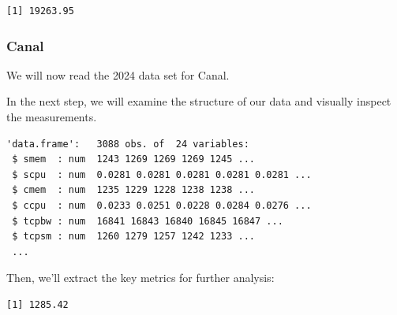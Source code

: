 \begin{verbatim}
[1] 19263.95
\end{verbatim}

\subsubsection{Canal}

We will now read the 2024 data set for Canal.

\begin{Shaded}
\begin{Highlighting}[]
\OtherTok{\textless{}{-}} 
\OtherTok{\textless{}{-}} \NormalTok{(}\NormalTok{,}\NormalTok{))}
\end{Highlighting}
\end{Shaded}

In the next step, we will examine the structure of our data and visually
inspect the measurements.

\begin{Shaded}
\begin{Highlighting}[]
\end{Highlighting}
\end{Shaded}

\begin{verbatim}
'data.frame':   3088 obs. of  24 variables:
 $ smem  : num  1243 1269 1269 1269 1245 ...
 $ scpu  : num  0.0281 0.0281 0.0281 0.0281 0.0281 ...
 $ cmem  : num  1235 1229 1228 1238 1238 ...
 $ ccpu  : num  0.0233 0.0251 0.0228 0.0284 0.0276 ...
 $ tcpbw : num  16841 16843 16840 16845 16847 ...
 $ tcpsm : num  1260 1279 1257 1242 1233 ...
 ...
\end{verbatim}

Then, we'll extract the key metrics for further analysis:

\begin{Shaded}
\begin{Highlighting}[]
\SpecialCharTok{\$}
\end{Highlighting}
\end{Shaded}

\begin{verbatim}
[1] 1285.42
\end{verbatim}

\begin{Shaded}
\begin{Highlighting}[]
\SpecialCharTok{\$}
\end{Highlighting}
\end{Shaded}

